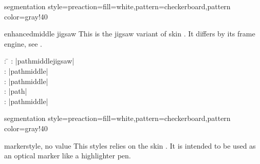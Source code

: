 \begin{dispExample*}{segmentation style={preaction={fill=white},pattern=checkerboard,pattern color=gray!40}}
\end{dispExample*}


\clearpage
\begin{docSkin}{enhancedmiddle jigsaw}
  This is the jigsaw variant of skin .
  It differs by its frame engine, see .
\begin{tcolorbox}[skintable=enhancedmiddle jigsaw]
  \begin{tabbing}
    : \=\kill
    :           \> |pathmiddlejigsaw|\\
    : \> |pathmiddle|\\ 
    :        \> |pathmiddle|\\
    :    \> |path|\\
    :           \> |pathmiddle|
  \end{tabbing}
\end{tcolorbox}
\end{docSkin}


\begin{dispExample*}{segmentation style={preaction={fill=white},pattern=checkerboard,pattern color=gray!40}}
\end{dispExample*}


\begin{docTcbKey}{marker}{}{style, no value}
  This styles relies on the skin . It is
  intended to be used as an optical marker like a highlighter pen.
\begin{dispExample}
\begin{tcolorbox}[marker]
\lipsum[2]
\end{tcolorbox}
\end{dispExample}
\end{docTcbKey}

\clearpage

